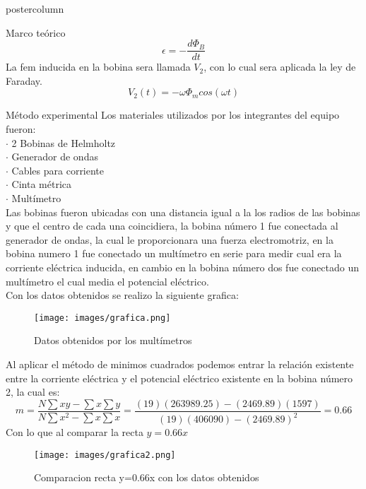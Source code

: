 \documentclass{beamer}
\begin{document}
\begin{columns}
\begin{column}{.50\textwidth}
\begin{beamercolorbox}[center]{postercolumn}
\begin{minipage}{.98\textwidth}
{\begin{myblock}{Marco teórico}
\begin{equation}
 \epsilon= -\frac{d\Phi_B}{dt}
\end{equation}
La fem inducida en la bobina sera llamada $V_2$, con lo cual sera aplicada la ley de Faraday.
\begin{equation}
V_2 (t) = -  \omega \Phi_m cos(\omega t)
\end{equation}
\end{myblock}
\begin{myblock}{Método experimental}
Los materiales utilizados por los integrantes del equipo fueron:\\
$\cdot$ 2 Bobinas de Helmholtz\\
$\cdot$ Generador de ondas\\
$\cdot$ Cables para corriente\\
$\cdot$ Cinta métrica\\
$\cdot$ Multímetro\\
Las bobinas fueron ubicadas con una distancia igual a la los radios de las bobinas y que el centro de cada una coincidiera, la bobina número 1 fue conectada al generador de ondas, la cual le proporcionara una fuerza electromotriz, en la bobina numero 1 fue conectado un multímetro en serie para medir cual era la corriente eléctrica inducida, en cambio en la bobina número dos fue conectado un multímetro el cual media el potencial eléctrico.\\
Con los datos obtenidos se realizo la siguiente grafica:\\
\begin{center}
\begin{figure}
\texttt{[image: images/grafica.png]}
\caption{Datos obtenidos por los multímetros}
\end{figure}
\end{center}
Al aplicar el método de minimos cuadrados podemos entrar la relación existente entre la corriente eléctrica y el potencial eléctrico existente en la bobina número 2, la cual es:
\begin{equation*}
m=\frac{N \sum xy - \sum x \sum y}{N\sum x^2 -\sum x \sum x} = \frac{(19)(263989.25)-(2469.89)(1597)}{(19)(406090)-(2469.89)^2} = 0.66
\end{equation*}
Con lo que al comparar la recta $y=0.66x$ 
\begin{center}
\begin{figure}
\texttt{[image: images/grafica2.png]}
\caption{Comparacion recta y=0.66x con los datos obtenidos}
\end{figure}

\end{center}
\end{myblock}}
\end{minipage}
\end{beamercolorbox}
\end{column}
\end{columns}
\end{document}
